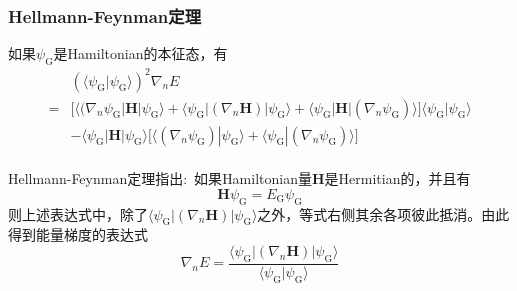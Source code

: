 \frame
{
	\frametitle{\textrm{Hellmann-Feynman}定理}
	如果$\psi_{\mathrm{G}}$是\textrm{Hamiltonian}的本征态，有
	\begin{displaymath}
		\begin{aligned}
			&(\langle\psi_{\mathrm{G}}|\psi_{\mathrm{G}}\rangle)^2\nabla_nE\\
			=&\big[\langle(\nabla_n\psi_{\mathrm{G}}|\mathbf{H}|\psi_{\mathrm{G}}\rangle+\langle\psi_{\mathrm{G}}|(\nabla_n\mathbf{H})|\psi_{\mathrm{G}}\rangle+\langle\psi_{\mathrm{G}}|\mathbf{H}|(\nabla_n\psi_{\mathrm{G}})\rangle\big]\langle\psi_{\mathrm{G}}|\psi_{\mathrm{G}}\rangle\\
			&-\langle\psi_{\mathrm{G}}|\mathbf{H}|\psi_{\mathrm{G}}\rangle\big[\langle(\nabla_n\psi_{\mathrm{G}})|\psi_{\mathrm{G}}\rangle+\langle\psi_{\mathrm{G}}|(\nabla_n\psi_{\mathrm{G}})\rangle\big]
		\end{aligned}
	\end{displaymath}
	{\fontsize{6.2pt}{5.2pt}}\\
	\vskip 5pt
	\textrm{Hellmann-Feynman}定理指出:~如果\textrm{Hamiltonian}量$\mathbf{H}$是\textrm{Hermitian}的，并且有
	\begin{displaymath}
		\mathbf{H}\psi_{\mathrm{G}}=E_{\mathrm{G}}\psi_{\mathrm{G}}
	\end{displaymath}
则上述表达式中，除了$\langle\psi_{\mathrm{G}}|(\nabla_n\mathbf{H})|\psi_{\mathrm{G}}\rangle$之外，等式右侧其余各项彼此抵消。由此得到能量梯度的表达式
\begin{displaymath}
	\nabla_nE=\dfrac{\langle\psi_{\mathrm{G}}|(\nabla_n\mathbf{H})|\psi_{\mathrm{G}}\rangle}{\langle\psi_{\mathrm{G}}|\psi_{\mathrm{G}}\rangle}
\end{displaymath}
}

